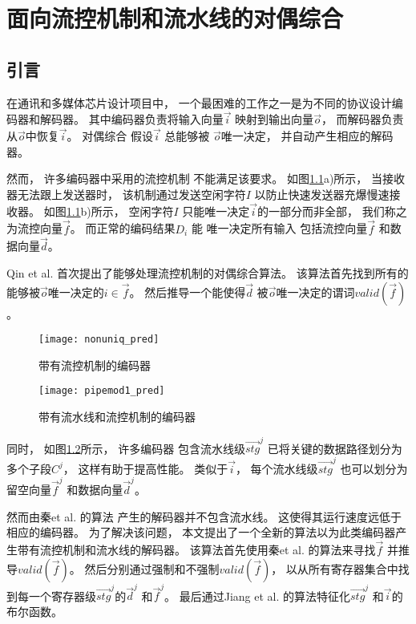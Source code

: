 


\chapter{面向流控机制和流水线的对偶综合}
\label{chap:4}

\section{引言}\label{sec_intro}
在通讯和多媒体芯片设计项目中，
一个最困难的工作之一是为不同的协议设计编码器和解码器。
其中编码器负责将输入向量$\vec{i}$ 映射到输出向量$\vec{o}$，
而解码器负责从$\vec{o}$中恢复$\vec{i}$。
对偶综合
假设$\vec{i}$ 总能够被 $\vec{o}$唯一决定，
并自动产生相应的解码器。

然而，
许多编码器中采用的流控机制
不能满足该要求。
如图\ref{fig_fc}a)所示，
当接收器无法跟上发送器时，
该机制通过发送空闲字符$I$ 以防止快速发送器充爆慢速接收器。
如图\ref{fig_fc}b)所示，
空闲字符$I$
只能唯一决定$\vec{i}$的一部分而非全部，
我们称之为流控向量$\vec{f}$。
而正常的编码结果$D_i$ 能
唯一决定所有输入
包括流控向量$\vec{f}$ 和数据向量$\vec{d}$。

Qin et al.  首次提出了能够处理流控机制的对偶综合算法。
该算法首先找到所有的能够被$\vec{o}$唯一决定的$i\in\vec{f}$。
然后推导一个能使得$\vec{d}$ 被$\vec{o}$唯一决定的谓词$valid(\vec{f})$。

\begin{figure}[t]
\centering
\texttt{[image: nonuniq\_pred]}
\caption{带有流控机制的编码器}
\label{fig_fc}
\end{figure}

\begin{figure}[b]
\centering
\texttt{[image: pipemod1\_pred]}
\caption{带有流水线和流控机制的编码器}
\label{fig_pipeenc}
\end{figure}



同时，
如图\ref{fig_pipeenc}所示，
许多编码器
包含流水线级$\vec{stg}^j$ 已将关键的数据路径划分为多个子段$C^j$，
这样有助于提高性能。
类似于$\vec{i}$，
每个流水线级$\vec{stg}^j$ 也可以划分为留空向量$\vec{f}^j$ 和数据向量$\vec{d}^j$。

然而由秦et al. 的算法 产生的解码器并不包含流水线。
这使得其运行速度远低于相应的编码器。
为了解决该问题，
本文提出了一个全新的算法以为此类编码器产生带有流控机制和流水线的解码器。
该算法首先使用秦et al. 的算法来寻找$\vec{f}$ 并推导$valid(\vec{f})$。
然后分别通过强制和不强制$valid(\vec{f})$，
以从所有寄存器集合中找到每一个寄存器级$\vec{stg}^j$的$\vec{d}^j$ 和$\vec{f}^j$。
最后通过Jiang et al. 的算法特征化$\vec{stg}^j$ 和$\vec{i}$的布尔函数。

